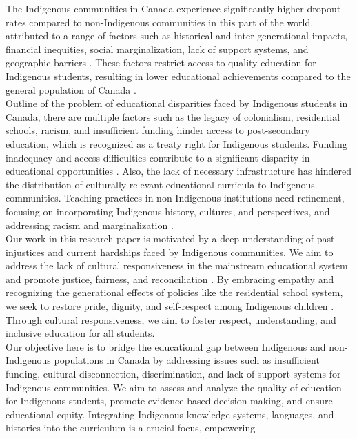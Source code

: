 \documentclass[a4paper,twoside]{article}
\begin{document}
The Indigenous communities in Canada experience significantly higher dropout rates compared to non-Indigenous communities in this part of the world, attributed to a range of factors such as historical and inter-generational impacts, financial inequities, social marginalization, lack of support systems, and geographic barriers \cite{GovtOfOntario17}. These factors restrict access to quality education for Indigenous students, resulting in lower educational achievements compared to the general population of Canada \cite{CFSOntario21}.\\Outline of the problem of educational disparities faced by Indigenous students in Canada, there are multiple factors such as the legacy of colonialism, residential schools, racism, and insufficient funding hinder access to post-secondary education, which is recognized as a treaty right for Indigenous students. Funding inadequacy and access difficulties contribute to a significant disparity in educational opportunities \cite{Brown23}. Also, the lack of necessary infrastructure has hindered the distribution of culturally relevant educational curricula to Indigenous communities. Teaching practices in non-Indigenous institutions need refinement, focusing on incorporating Indigenous history, cultures, and perspectives, and addressing racism and
marginalization \cite{GovtOfCanadaEthics19}.\\Our work in this research paper is motivated by a deep understanding of past injustices and current hardships faced by Indigenous communities. We aim to address the lack of cultural responsiveness in the mainstream educational system and promote justice, fairness, and reconciliation \cite{Weston19}. By embracing empathy and recognizing the generational effects of policies like the residential school system, we seek to restore pride, dignity, and self-respect among Indigenous children \cite{Kim19}. Through cultural responsiveness, we aim to foster respect, understanding, and inclusive education for all students.\\Our objective here is to bridge the educational gap between Indigenous and non-Indigenous populations in Canada by addressing issues such as insufficient funding, cultural disconnection, discrimination, and lack of support systems for Indigenous communities. We aim to assess and analyze the quality of education for Indigenous students, promote evidence-based decision making, and ensure educational equity. Integrating Indigenous knowledge systems, languages, and histories into the curriculum is a crucial focus, empowering
\end{document}
